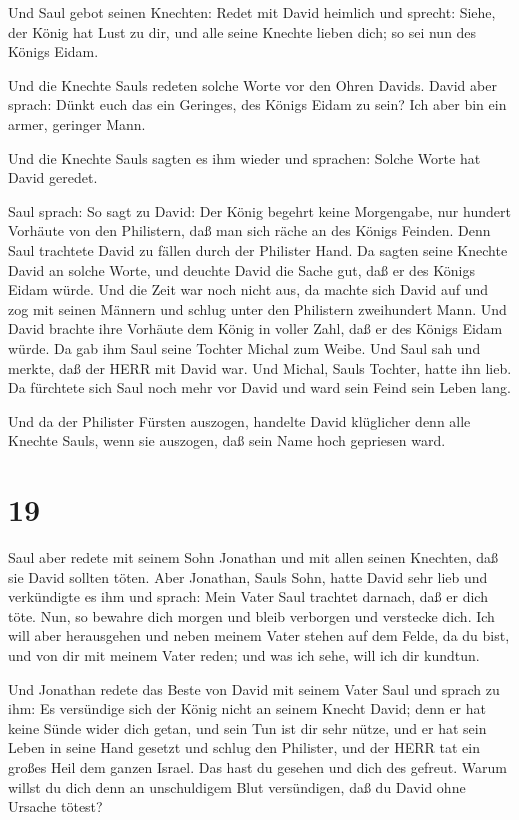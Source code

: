  Und Saul gebot seinen Knechten: Redet mit David heimlich
und sprecht: Siehe, der König hat Lust zu dir, und alle seine Knechte
lieben dich; so sei nun des Königs Eidam.

 Und die Knechte Sauls redeten solche Worte vor den Ohren
Davids. David aber sprach: Dünkt euch das ein Geringes, des Königs Eidam
zu sein? Ich aber bin ein armer, geringer Mann.

 Und die Knechte Sauls sagten es ihm wieder und sprachen:
Solche Worte hat David geredet.

 Saul sprach: So sagt zu David: Der König begehrt keine
Morgengabe, nur hundert Vorhäute von den Philistern, daß man sich räche
an des Königs Feinden. Denn Saul trachtete David zu fällen durch der
Philister Hand.  Da sagten seine Knechte David an solche
Worte, und deuchte David die Sache gut, daß er des Königs Eidam würde.
Und die Zeit war noch nicht aus,  da machte sich David auf
und zog mit seinen Männern und schlug unter den Philistern zweihundert
Mann. Und David brachte ihre Vorhäute dem König in voller Zahl, daß er
des Königs Eidam würde. Da gab ihm Saul seine Tochter Michal zum Weibe.
 Und Saul sah und merkte, daß der HERR mit David war. Und
Michal, Sauls Tochter, hatte ihn lieb.  Da fürchtete sich
Saul noch mehr vor David und ward sein Feind sein Leben lang.

 Und da der Philister Fürsten auszogen, handelte David
klüglicher denn alle Knechte Sauls, wenn sie auszogen, daß sein Name
hoch gepriesen ward.

\hypertarget{section-18}{%
\section{19}\label{section-18}}

 Saul aber redete mit seinem Sohn Jonathan und mit allen
seinen Knechten, daß sie David sollten töten. Aber Jonathan, Sauls Sohn,
hatte David sehr lieb  und verkündigte es ihm und sprach:
Mein Vater Saul trachtet darnach, daß er dich töte. Nun, so bewahre dich
morgen und bleib verborgen und verstecke dich.  Ich will
aber herausgehen und neben meinem Vater stehen auf dem Felde, da du
bist, und von dir mit meinem Vater reden; und was ich sehe, will ich dir
kundtun.

 Und Jonathan redete das Beste von David mit seinem Vater
Saul und sprach zu ihm: Es versündige sich der König nicht an seinem
Knecht David; denn er hat keine Sünde wider dich getan, und sein Tun ist
dir sehr nütze,  und er hat sein Leben in seine Hand gesetzt
und schlug den Philister, und der HERR tat ein großes Heil dem ganzen
Israel. Das hast du gesehen und dich des gefreut. Warum willst du dich
denn an unschuldigem Blut versündigen, daß du David ohne Ursache tötest?

